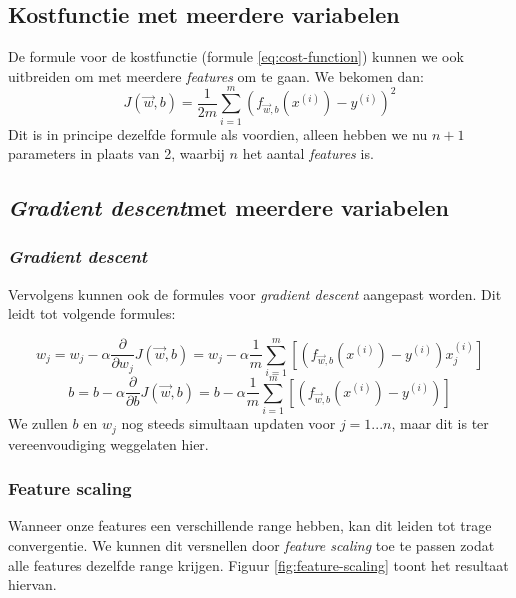\subsection{Kostfunctie met meerdere variabelen}

De formule voor de kostfunctie (formule \ref{eq:cost-function}) kunnen we ook uitbreiden om met meerdere \textit{features} om te gaan. We bekomen dan:
\begin{equation}
	J(\vec{w}, b) = \frac{1}{2m}\sum_{i=1}^{m}(f_{\vec{w},b}(x^{(i)}) - y^{(i)})^{2}
	\label{eq:cost-function-multi}
\end{equation}
\noindent
Dit is in principe dezelfde formule als voordien, alleen hebben we nu $n+1$ parameters in plaats van 2, waarbij $n$ het aantal \textit{features} is.
\newpage

\subsection{\textit{Gradient descent}met meerdere variabelen}

\subsubsection{\textit{Gradient descent}}

Vervolgens kunnen ook de formules voor \textit{gradient descent} aangepast worden. Dit leidt tot volgende formules:

\begin{equation}
	w_{j} = w_{j} - \alpha \frac{\partial}{\partial w_{j}} J(\vec{w}, b) = w_{j} - \alpha \frac{1}{m}\sum_{i=1}^{m}[(f_{\vec{w},b}(x^{(i)}) - y^{(i)})x^{(i)}_{j}]
	\label{eq:gradient-descent-lin-reg-multi-w}
\end{equation}
\begin{equation}
	b = b - \alpha \frac{\partial}{\partial b} J(\vec{w}, b) = b - \alpha \frac{1}{m}\sum_{i=1}^{m}[(f_{\vec{w},b}(x^{(i)}) - y^{(i)})]
	\label{eq:gradient-descent-lin-reg-multi-b}
\end{equation}
\noindent
We zullen $b$ en $w_{j}$ nog steeds simultaan updaten voor $j = 1...n$, maar dit is ter vereenvoudiging weggelaten hier.

\subsubsection{Feature scaling}

Wanneer onze features een verschillende range hebben, kan dit leiden tot trage convergentie. We kunnen dit versnellen door \textit{feature scaling} toe te passen zodat alle features dezelfde range krijgen. Figuur \ref{fig:feature-scaling} toont het resultaat hiervan.

